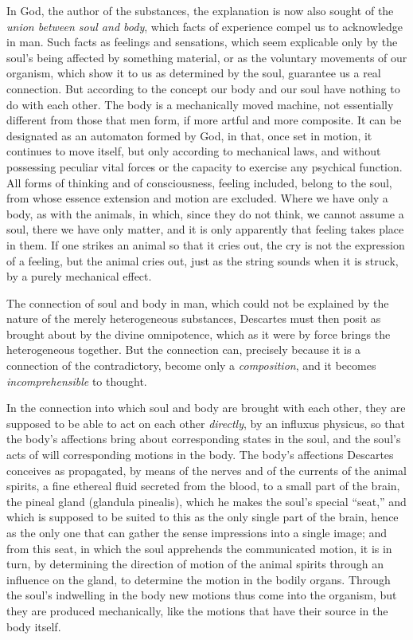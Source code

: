 In God, the author of the substances, the explanation is now also sought of the \emph{union between soul and body}, which facts of experience compel us to acknowledge in man. Such facts as feelings and sensations, which seem explicable only by the soul's being affected by something material, or as the voluntary movements of our organism, which show it to us as determined by the soul, guarantee us a real connection. But according to the concept our body and our soul have nothing to do with each other. The body is a mechanically moved machine, not essentially different from those that men form, if more artful and more composite. It can be designated as an automaton formed by God, in that, once set in motion, it continues to move itself, but only according to mechanical laws, and without possessing peculiar vital forces or the capacity to exercise any psychical function. All forms of thinking and of consciousness, feeling included, belong to the soul, from whose essence extension and motion are excluded. Where we have only a body, as with the animals, in which, since they do not think, we cannot assume a soul, there we have only matter, and it is only apparently that feeling takes place in them. If one strikes an animal so that it cries out, the cry is not the expression of a feeling, but the animal cries out, just as the string sounds when it is struck, by a purely mechanical effect.

The connection of soul and body in man, which could not be explained by the nature of the merely heterogeneous substances, Descartes must then posit as brought about by the divine
omnipotence, which as it were by force brings the heterogeneous together. But the connection can, precisely because it is a connection of the contradictory, become only a \emph{composition}, and it becomes \emph{incomprehensible} to thought.

In the connection into which soul and body are brought with each other, they are supposed to be able to act on each other \emph{directly}, by an influxus physicus, so that the body's affections bring about corresponding states in the soul, and the soul's acts of will corresponding motions in the body. The body's affections Descartes conceives as propagated, by means of the nerves and of the currents of the animal spirits, a fine ethereal fluid secreted from the blood, to a small part of the brain, the pineal gland (glandula pinealis), which he makes the soul's special ``seat,'' and which is supposed to be suited to this as the only single part of the brain, hence as the only one that can gather the sense impressions into a single image; and from this seat, in which the soul apprehends the communicated motion, it is in turn, by determining the direction of motion of the animal spirits through an influence on the gland, to determine the motion in the bodily organs. Through the soul's indwelling in the body new motions thus come into the organism, but they are produced mechanically, like the motions that have their source in the body itself.

